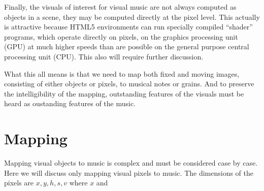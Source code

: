 \documentclass[english,11pt,letterpaper,onecolumn]{scrartcl}
\begin{document}
Finally, the visuals of interest for visual music are not always 
computed as objects in a scene, they may be computed directly at the 
pixel level. This actually is attractive because HTML5 environments can run 
specially compiled ``shader'' programs, which operate directly on pixels, on 
the graphics processing unit (GPU) at much higher speeds than are possible on 
the general purpose central processing unit (CPU). This also will require 
further discussion.

What this all means is that we need to map both fixed and moving images, 
consisting of either objects or pixels, to musical notes or grains. And to 
preserve the intelligibility of the mapping, outstanding features of the 
visuals must be heard as oustanding features of the music.

\section{Mapping}

Mapping visual objects to music is complex and must be considered case by 
case. Here we will discuss only mapping visual pixels to music. The dimensions 
of the pixels are $x, y, h, s, v$ where $x$ and 
\end{document}
